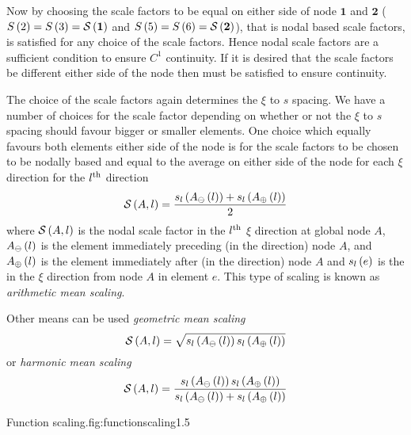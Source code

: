 Now by choosing the scale factors to be equal on either side of node
$\mathbf{1}$ and $\mathbf{2}$ (\ie $   S \left( {2} \right)  =   S \left( {3} \right)  =   \mathcal{S} \left( \mathbf{1} \right)  $
and $   S \left( {5} \right)  =   S \left( {6} \right)  =   \mathcal{S} \left( \mathbf{2} \right)  $), that is nodal based scale
factors,  is satisfied for any choice of the scale
factors.  Hence nodal scale factors are a sufficient condition to ensure
$C^{1}$ continuity. If it is desired that the scale factors be different
either side of the node then  must be satisfied to
ensure continuity.

The choice of the scale factors again determines the $\xi$
to $s$ spacing. We have a number of choices for the scale factor depending on
whether or not the $\xi$ to $s$ spacing should favour bigger or smaller
elements. One choice which equally favours both elements either side of the
node is for the scale factors to be chosen to be nodally based and equal to the average \arclen on either side
of the node for each $\xi$ direction \ie for the ${l}^{\text{th}}$ direction
\begin{equation}
     \mathcal{S} \left( A,l \right)  =\dfrac{ s_{l}\left(  A_{\ominus}\left( l \right)  \right) +
     s_{l}\left(  A_{\oplus}\left( l \right)  \right) }{2}
  \label{eqn:arithmeanarclenscale}
\end{equation}
where $   \mathcal{S} \left( A,l \right)  $ is the nodal scale factor in the ${l}^{\text{th}}$ $\xi$
direction at global node $A$, $ A_{\ominus}\left( l \right) $ is the element
immediately preceding (in the  direction) node $A$, and
$ A_{\oplus}\left( l \right) $ is the element immediately after (in the 
direction) node $A$ and $ s_{l}\left( e \right) $ is the \arclen in the  $\xi$
direction from node $A$ in element $e$. This type of scaling is known as
\emph{arithmetic mean \arclen scaling}.

Other means can be used \ie \emph{geometric mean \arclen scaling}
\begin{equation}
     \mathcal{S} \left( A,l \right)  =\sqrt{ s_{l}\left(  A_{\ominus}\left( l \right)  \right) 
     s_{l}\left(  A_{\oplus}\left( l \right)  \right) }
  \label{eqn:geomeanarclenscale}
\end{equation}
or \emph{harmonic mean \arclen scaling}
\begin{equation}
     \mathcal{S} \left( A,l \right)  =\dfrac{ s_{l}\left(  A_{\ominus}\left( l \right)  \right) 
     s_{l}\left(  A_{\oplus}\left( l \right)  \right) }{ s_{l}\left(  A_{\ominus}\left( l \right)  \right) +
     s_{l}\left(  A_{\oplus}\left( l \right)  \right) }
  \label{eqn:harmonicmeanarclenscale}
\end{equation}



{Function scaling.}{fig:functionscaling}{1.5}

